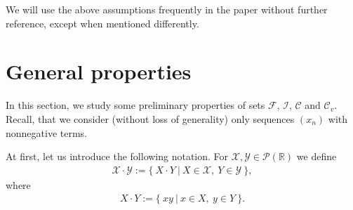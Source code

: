 \documentclass{amsart}
\theoremstyle{definition}
\newcommand{\Cv}{\mathcal{C}_{v}}
\begin{document}
We will use the above assumptions frequently in the paper without further reference, except when mentioned differently.



\section{General properties}


In this section, we study some preliminary properties of sets $\mathcal{F}$, $\mathcal{I}$, $\mathcal{C}$ and $\Cv$. Recall, that we consider (without loss of generality) only sequences $(x_{n})$ with nonnegative terms.


At first, let us introduce the following notation. For $\mathcal{X},\mathcal{Y}\in\mathcal{P}(\mathbb{R})$ we define
\begin{align*}
\mathcal{X}\cdot \mathcal{Y} := \big\{\ X\cdot Y\ \big|\ X\in\mathcal{X},\ Y\in\mathcal{Y} \ \big\},
\end{align*}
where
\begin{align*}
X\cdot Y:= \big\{\ xy\ \big|\ x\in X,\ y\in Y\ \big\}.
\end{align*}
\end{document}
